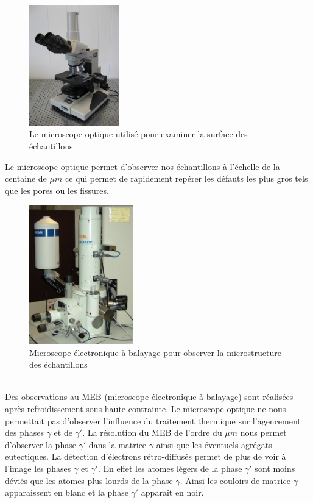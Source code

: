 \begin{figure}[H]
    \centering
    \includegraphics[width=0.35\textwidth]{images/optique.jpg}
    \caption{Le microscope optique utilisé pour examiner la surface des échantillons}
    \label{fig:microscope_optique}
\end{figure}


Le microscope optique permet d'observer nos échantillons à l'échelle de la centaine de $\mu m$ ce qui permet de rapidement repérer les défauts les plus gros tels que les pores ou les fissures.
\\


\begin{figure}[H]
    \centering
    \includegraphics[width=0.4\textwidth]{images/JEOL_JSM-6340F.jpg}
    \caption{Microscope électronique à balayage pour observer la microstructure des échantillons}
    \label{<label>}
\end{figure}
\\
Des observations au MEB (microscope électronique à balayage) sont réalisées après refroidissement sous haute contrainte. Le microscope optique ne nous permettait pas d'observer l'influence du traitement thermique sur l'agencement des phases $\gamma$ et de $\gamma'$. La résolution du MEB de l'ordre du $\mu m$ nous permet d'observer la phase $\gamma'$ dans la matrice $\gamma$ ainsi que les éventuels agrégats eutectiques. La détection d'électrons rétro-diffusés permet de plus de voir à l'image les phases $\gamma$ et $\gamma'$. En effet les atomes légers de la phase $\gamma'$ sont moins déviés que les atomes plus lourds de la phase $\gamma$. Ainsi les couloirs de matrice $\gamma$ apparaissent en blanc et la phase $\gamma'$ apparaît en noir.
\newpage

